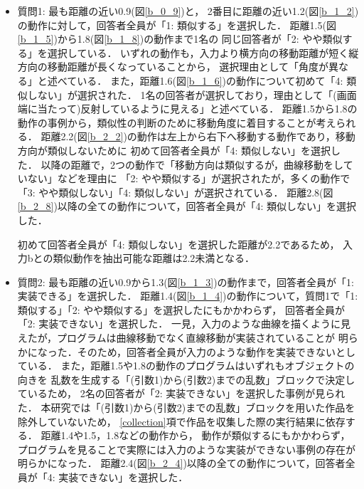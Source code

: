 \documentclass[11pt]{jreport}
\begin{document}
\begin{itemize}
    \item 質問1: 最も距離の近い0.9(図\ref{b_0_9})と，
    2番目に距離の近い1.2(図\ref{b_1_2})の動作に対して，回答者全員が「1: 類似する」を選択した．
    距離1.5(図\ref{b_1_5})から1.8(図\ref{b_1_8})の動作まで1名の
    同じ回答者が「2: やや類似する」を選択している．
    いずれの動作も，入力より横方向の移動距離が短く縦方向の移動距離が長くなっていることから，
    選択理由として「角度が異なる」と述べている．
    また，距離1.6(図\ref{b_1_6})の動作について初めて「4: 類似しない」が選択された．
    1名の回答者が選択しており，理由として「(画面端に当たって)反射しているように見える」と述べている．
    距離1.5から1.8の動作の事例から，類似性の判断のために移動角度に着目することが考えられる．
    距離2.2(図\ref{b_2_2})の動作は左上から右下へ移動する動作であり，移動方向が類似しないために
    初めて回答者全員が「4: 類似しない」を選択した．
    以降の距離で，2つの動作で「移動方向は類似するが，曲線移動をしていない」などを理由に
    「2: やや類似する」が選択されたが，多くの動作で「3: やや類似しない」「4: 類似しない」が選択されている．
    距離2.8(図\ref{b_2_8})以降の全ての動作について，回答者全員が「4: 類似しない」を選択した．
    
    初めて回答者全員が「4: 類似しない」を選択した距離が2.2であるため，
    入力bとの類似動作を抽出可能な距離は2.2未満となる．
    
    \item 質問2: 最も距離の近い0.9から1.3(図\ref{b_1_3})の動作まで，回答者全員が「1: 実装できる」を選択した．
    距離1.4(図\ref{b_1_4})の動作について，質問1で「1: 類似する」「2: やや類似する」を選択したにもかかわらず，
    回答者全員が「2: 実装できない」を選択した．
    一見，入力のような曲線を描くように見えたが，プログラムは曲線移動でなく直線移動が実装されていることが
    明らかになった．そのため，回答者全員が入力のような動作を実装できないとしている．
    また，距離1.5や1.8の動作のプログラムはいずれもオブジェクトの向きを
    乱数を生成する「(引数1)から(引数2)までの乱数」ブロックで決定しているため，
    2名の回答者が「2: 実装できない」を選択した事例が見られた．
    本研究では「(引数1)から(引数2)までの乱数」ブロックを用いた作品を除外していないため，
    \ref{collection}項で作品を収集した際の実行結果に依存する．
    距離1.4や1.5，1.8などの動作から，
    動作が類似するにもかかわらず，プログラムを見ることで実際には入力のような実装ができない事例の存在が
    明らかになった．
    距離2.4(図\ref{b_2_4})以降の全ての動作について，回答者全員が「4: 実装できない」を選択した．
\end{itemize}    
    
\end{document}
